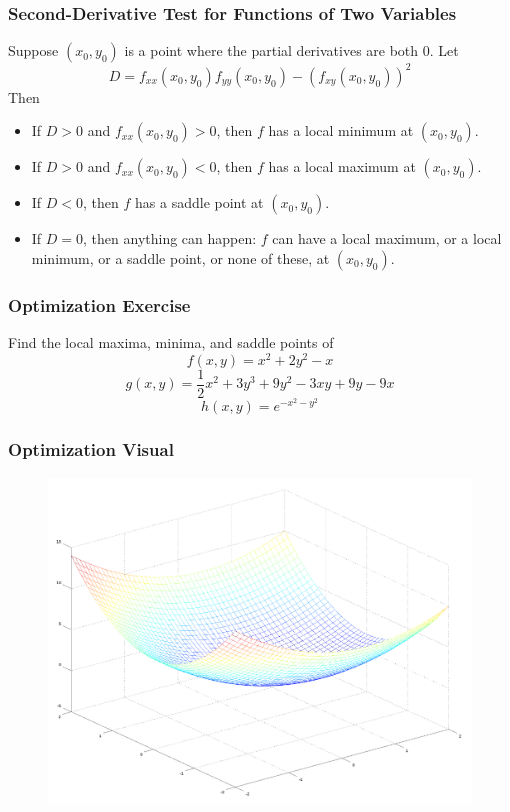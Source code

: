 \documentclass[xcolor=dvipsnames]{beamer}
\begin{document}
\begin{frame}
  \frametitle{Second-Derivative Test for Functions of Two Variables}
  Suppose $(x_{0},y_{0})$ is a point where the partial derivatives are
  both 0. Let
  \begin{equation}
    \label{eq:eezongoo}
    D=f_{xx}(x_{0},y_{0})f_{yy}(x_{0},y_{0})-(f_{xy}(x_{0},y_{0}))^{2}
  \end{equation}
  Then
  \begin{itemize}
  \item If $D>0$ and $f_{xx}(x_{0},y_{0})>0$, then $f$ has a local minimum at $(x_{0},y_{0})$.
  \item If $D>0$ and $f_{xx}(x_{0},y_{0})<0$, then $f$ has a local maximum at $(x_{0},y_{0})$.
  \item If $D<0$, then $f$ has a saddle point at $(x_{0},y_{0})$.
  \item If $D=0$, then anything can happen: $f$ can have a local maximum, or a local minimum, or a saddle point, or none of these, at $(x_{0},y_{0})$.
  \end{itemize}
\end{frame}

\begin{frame}
  \frametitle{Optimization Exercise}
  {\ubung} Find the local maxima, minima, and saddle points of
  \begin{equation}
    \label{eq:onahsood}
    f(x,y)=x^{2}+2y^{2}-x
  \end{equation}
  \begin{equation}
    \label{eq:enaepain}
    g(x,y)=\frac{1}{2}x^{2}+3y^{3}+9y^{2}-3xy+9y-9x
  \end{equation}
  \begin{equation}
    \label{eq:phedohde}
    h(x,y)=e^{-x^{2}-y^{2}}
  \end{equation}
\end{frame}

\begin{frame}
  \frametitle{Optimization Visual}
  \begin{figure}[h]
    \includegraphics[scale=0.27]{./diagrams/threed1.png}
  \end{figure}
\end{frame}
\end{document}
